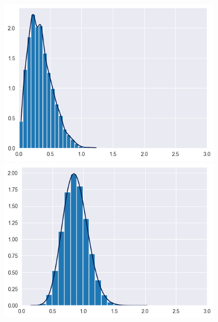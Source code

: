 \documentclass[smaller]{beamer}
\theoremstyle{example}
\begin{document}
\begin{frame}
    \centering
    \begin{figure}
        \begin{minipage}{0.32\textwidth}
            \includegraphics[width=\textwidth]{../../Images/pairwise-distances-dim2.png}
        \end{minipage}
        \hfill
        \begin{minipage}{0.32\textwidth}
            \includegraphics[width=\textwidth]{../../Images/pairwise-distances-dim10.png}
        \end{minipage}
        \hfill
        \begin{minipage}{0.32\textwidth}

\end{minipage}
\end{figure}
\end{frame}
\end{document}
